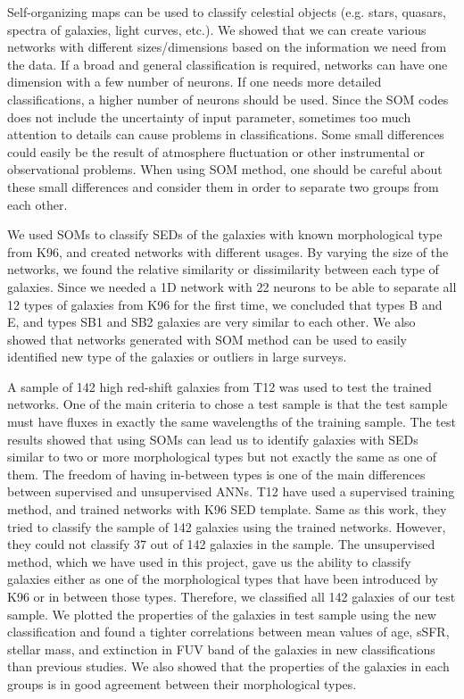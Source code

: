 \documentclass[useAMS,usenatbib]{mn2e}
\begin{document}
Self-organizing maps can be used to classify celestial objects (e.g. stars, quasars, spectra of galaxies, light curves, etc.).
We showed that we can create various networks with different sizes/dimensions based on the information we need from the data. 
If a broad and general classification is required, networks can have one dimension with a few number of neurons.
If one needs more detailed classifications, a higher number of neurons should be used.
Since the SOM codes does not include the uncertainty of input parameter, sometimes too much attention to details can cause problems in classifications. 
Some small differences could easily be the result of atmosphere fluctuation or other instrumental or observational problems. 
When using SOM method, one should be careful about these small differences and consider them in order to separate two groups from each other.

We used SOMs to classify SEDs of the galaxies with known morphological type from K96, and created networks with different usages.
By varying the size of the networks, we found the relative similarity or dissimilarity between each type of galaxies.
Since we needed a 1D network with 22 neurons to be able to separate all 12 types of galaxies from K96 for the first time, we concluded that types B and E, and types SB1 and SB2 galaxies are very similar to each other.
We also showed that networks generated with SOM method can be used to easily identified new type of the galaxies or outliers in large surveys.

A sample of 142 high red-shift galaxies from T12 was used to test the trained networks.
One of the main criteria to chose a test sample is that the test sample must have fluxes in exactly the same wavelengths of the training sample.
The test results showed that using SOMs can lead us to identify galaxies with SEDs similar to two or more morphological types but not exactly the same as one of them.
The freedom of having in-between types is one of the main differences between supervised and unsupervised ANNs.
T12 have used a supervised training method, and trained networks with K96 SED template.
Same as this work, they tried to classify the sample of 142 galaxies using the trained networks.
However, they could not classify 37 out of 142 galaxies in the sample.
The unsupervised method, which we have used in this project, gave us the ability to classify galaxies either as one of the morphological types that have been introduced by K96 or in between those types. 
Therefore, we classified all 142 galaxies of our test sample.
We plotted the properties of the galaxies in test sample using the new classification and found a tighter correlations between mean values of age, sSFR, stellar mass, and extinction in FUV band of the galaxies in new classifications than previous studies.
We also showed that the properties of the galaxies in each groups is in good agreement between their morphological types.
\end{document}

